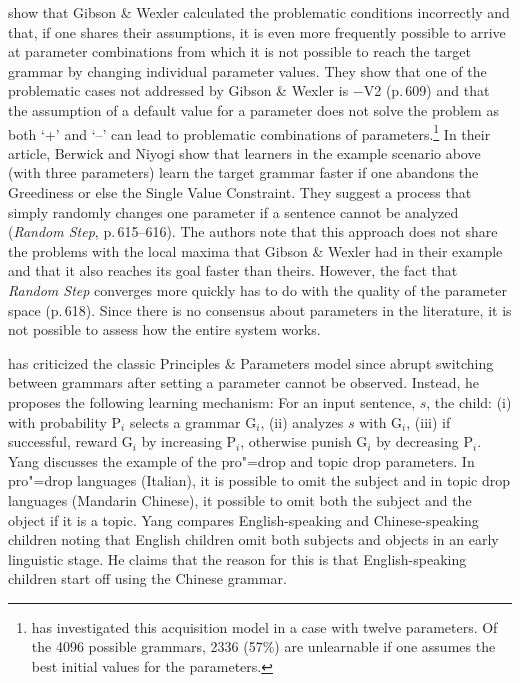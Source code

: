 \citet{BN96a} show that Gibson \& Wexler calculated the problematic conditions incorrectly and
that, if one shares their assumptions, it is even more frequently possible
to arrive at parameter combinations from which it is not possible to reach the target grammar by changing individual parameter values.
They show that one of the problematic cases not addressed by Gibson \& Wexler is $-$V2 (p.\,609) and that the assumption of a default value
for a parameter does not solve the problem as both `+' and `--' can lead to problematic combinations of parameters.\footnote{%
  \citet{Kohl99a,Kohl2000a} has investigated this acquisition model in a case with twelve parameters. Of the 4096 possible grammars,
  2336 (57\%) are unlearnable if one assumes the best initial values for the parameters.
}
In their article, Berwick and Niyogi show that learners in the example scenario above (with three
parameters) learn the target grammar faster if one abandons the Greediness 
or else the Single Value Constraint.
They suggest a process that simply randomly changes one parameter if a sentence cannot be analyzed (\emph{Random Step}, p.\,615--616).
The authors note that this approach does not share the problems with the local maxima  that Gibson \& Wexler had in their example and that it also reaches its goal faster
than theirs. However, the fact that \emph{Random Step} converges more quickly has to do with the quality of the parameter space (p.\,618).
Since there is no consensus about parameters in the literature, it is not possible to assess how the entire system works.

\citet[]{Yang2004a} has criticized the classic Principles \& Parameters model since abrupt switching between grammars after setting
a parameter cannot be observed. Instead, he proposes the following learning mechanism:
\ea
For an input sentence, $s$, the child:
(i) with probability P$_i$ selects a grammar G$_i$, (ii) analyzes $s$ with G$_i$, (iii) if successful, reward G$_i$ by increasing P$_i$,
otherwise punish G$_i$ by decreasing P$_i$.
\z
Yang discusses the example of the pro"=drop and topic drop parameters. In pro"=drop languages (\eg Italian),
it is possible to omit the subject and in topic drop languages (\eg Mandarin Chinese), it possible to omit both the subject and the object if it is
a topic. Yang compares English-speaking and Chinese-speaking children noting that English children omit both subjects and objects
in an early linguistic stage. He claims that the reason for this is that English-speaking children start off using the Chinese grammar.

